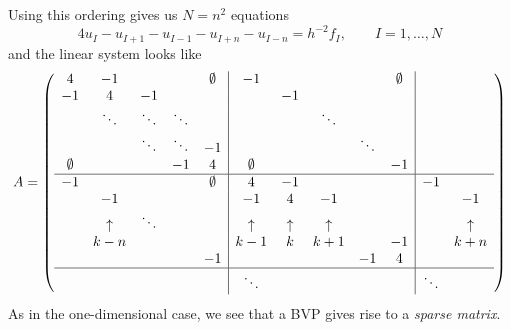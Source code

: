Using this ordering gives us $N=n^2$ equations
\begin{equation}
  4u_I-u_{I+1}-u_{I-1}-u_{I+n}-u_{I-n}=h^{-2}f_I,\qquad I=1,\ldots,N
  \label{eq:5-point-star-linear}
\end{equation}
and the linear system looks like
\begin{equation}
  \label{eq:5starmatrix}
  A=
  \left(\begin{array}{ccccc|ccccc|cc}
    4&-1&&&\emptyset&-1&&&&\emptyset&\\ 
    -1&4&-1&&&&-1&&&&\\ 
    &\ddots&\ddots&\ddots&&&&\ddots&&\\ 
    &&\ddots&\ddots&-1&&&&\ddots&\\ 
    \emptyset&&&-1&4&\emptyset&&&&-1&\\ \hline
    -1&&&&\emptyset&4&-1&&&&-1\\
    &-1      &      &&&-1      &4       &-1      &&&&-1\\
    &\uparrow&\ddots&&&\uparrow&\uparrow&\uparrow&&  &&\uparrow\\
    &k-n     &      &&&k-1     &k       &k+1     &&-1&&k+n\\
    &&&&-1&&&&-1&4&&\\ \hline
    &        &      &&&\ddots  &        &        &&  &\ddots\\
  \end{array}\right)
\end{equation}
As in the one-dimensional case, we see that a \ac{BVP}
gives rise to a \emph{sparse matrix}.

